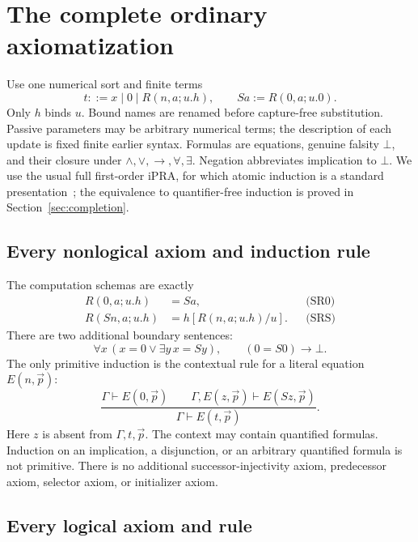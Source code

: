 \section{The complete ordinary axiomatization}
\label{sec:ordinary-rules}

Use one numerical sort and finite terms
\[
 t::=x\mid0\mid R(n,a;u.h),\qquad Sa:=R(0,a;u.0).
\]
Only $h$ binds $u$. Bound names are renamed before capture-free
substitution. Passive parameters may be arbitrary numerical terms; the
description of each update is fixed finite earlier syntax. Formulas are
equations, genuine falsity $\bot$, and their closure under
$\land,\lor,\to,\forall,\exists$. Negation abbreviates implication to
$\bot$. We use the usual full first-order iPRA, for which atomic induction
is a standard presentation~\cite{salehi}; the equivalence to
quantifier-free induction is proved in Section~\ref{sec:completion}.

\subsection{Every nonlogical axiom and induction rule}

The computation schemas are exactly
\begin{align*}
 R(0,a;u.h)&=Sa, &&\text{(SR0)}\\
 R(Sn,a;u.h)&=h[R(n,a;u.h)/u]. &&\text{(SRS)}
\end{align*}
There are two additional boundary sentences:
\[
 \forall x\,(x=0\lor\exists y\,x=Sy),\qquad
                 (0=S0)\to\bot. \tag{Cov,Sep}
\]
The only primitive induction is the contextual rule for a literal equation
$E(n,\vec p)$:
\[
 \frac{\Gamma\vdash E(0,\vec p)\qquad
       \Gamma,E(z,\vec p)\vdash E(Sz,\vec p)}
      {\Gamma\vdash E(t,\vec p)}. \tag{EI}
\]
Here $z$ is absent from $\Gamma,t,\vec p$. The context may contain
quantified formulas. Induction on an implication, a disjunction, or an
arbitrary quantified formula is not primitive. There is no additional
successor-injectivity axiom, predecessor axiom, selector axiom, or
initializer axiom.

\subsection{Every logical axiom and rule}

